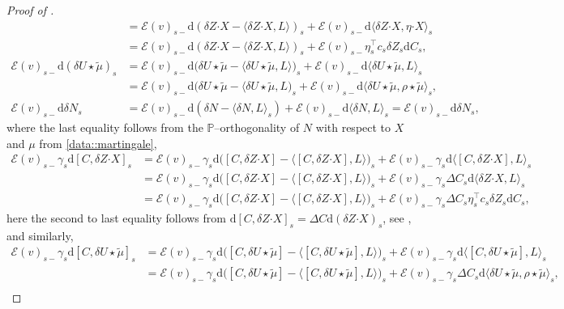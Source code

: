 \documentclass[10pt]{article} %
\newcommand\cE{\mathcal E}
\def \P{\mathbb{P}}
\newcommand{\bcdot}{\boldsymbol{\cdot}}
\newcommand{\1}{\mathbf{1}}
\def\d{\mathrm{d}}
\begin{document}
\begin{proof}[Proof of ]
\begin{align*}
		&= \cE(v)_{s-}\d (\delta Z \bcdot X - \langle \delta Z \bcdot X,L \rangle)_s + \cE(v)_{s-}\d\langle \delta Z \bcdot X, \eta \bcdot X \rangle_s \\
		&= \cE(v)_{s-}\d (\delta Z \bcdot X - \langle \delta Z\bcdot X,L \rangle)_s + \cE(v)_{s-} \eta^\top_s c_s\delta Z_s \d C_s,\\
		\cE(v)_{s-}\d(\delta U \star \tilde\mu)_s &= \cE(v)_{s-}\d\big(\delta U \star \tilde\mu - \langle \delta U \star\tilde\mu,L\rangle\big)_s + \cE(v)_{s-}\d \langle \delta U \star\tilde\mu,L\rangle_s \\
		&= \cE(v)_{s-}\d\big(\delta U \star \tilde\mu - \langle \delta U \star\tilde\mu,L\big)_s + \cE(v)_{s-}\d \langle \delta U \star\tilde\mu,\rho\star\tilde\mu\rangle_s,\\
		\cE(v)_{s-}\d \delta N_s &= \cE(v)_{s-}\d(\delta N-\langle \delta N, L \rangle_s) + \cE(v)_{s-}\d\langle \delta N,L\rangle_s = \cE(v)_{s-}\d\delta N_s,
	\end{align*}
	where the last equality follows from the $\P$--orthogonality of $N$ with respect to $X$ and $\mu$ from \ref{data::martingale},
	\begin{align*}
		\cE(v)_{s-}\gamma_s \d[C,\delta Z \bcdot X]_s 
		&= \cE(v)_{s-}\gamma_s \d\big([C,\delta Z \bcdot X]-\big\langle [C,\delta Z \bcdot X],L \big\rangle\big)_s + \cE(v)_{s-}\gamma_s \d\big\langle [C,\delta Z \bcdot X],L \big\rangle_s \\
		&= \cE(v)_{s-}\gamma_s \d\big([C,\delta Z \bcdot X]-\big\langle [C,\delta Z \bcdot X],L \big\rangle\big)_s + \cE(v)_{s-}\gamma_s \Delta C_s \d\langle \delta Z \bcdot X,L \rangle_s \\
		&= \cE(v)_{s-}\gamma_s \d\big([C,\delta Z \bcdot X]-\big\langle [C,\delta Z \bcdot X],L \big\rangle\big)_s + \cE(v)_{s-} \gamma_s \Delta C_s \eta_s^\top c_s \delta Z_s \d C_s,
	\end{align*}
	here the second to last equality follows from $\d [C,\delta Z \bcdot X]_s = \Delta C \d(\delta Z \bcdot X)_s$, see \cite[Proposition I.4.49]{jacod2003limit}, and similarly,
	\begin{align*}
		\cE(v)_{s-}\gamma_s \d[C,\delta U \star\tilde\mu]_s 
		&= \cE(v)_{s-}\gamma_s\d\big([C,\delta U \star\tilde\mu]-\big\langle [C,\delta U \star\tilde\mu],L \big\rangle\big)_s + \cE(v)_{s-} \gamma_s \d\big\langle [C,\delta U \star\tilde\mu],L \big\rangle_s \\
		&= \cE(v)_{s-}\gamma_s \d\big([C,\delta U \star\tilde\mu]-\big\langle [C,\delta U \star\tilde\mu],L \big\rangle\big)_s + \cE(v)_{s-}\gamma_s \Delta C_s \d\langle \delta U \star\tilde\mu,\rho\star\tilde\mu \rangle_s,\\

\end{align*}
\end{proof}
\end{document}
